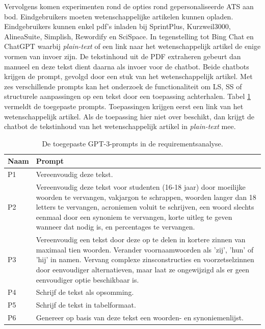 \medspace

Vervolgens komen experimenten rond de opties rond gepersonaliseerde ATS aan bod. Eindgebruikers moeten wetenschappelijke artikelen kunnen opladen. Eindgebruikers kunnen enkel pdf's inladen bij SprintPlus, Kurzweil3000, AlineaSuite, Simplish, Rewordify en SciSpace. In tegenstelling tot Bing Chat en ChatGPT waarbij \textit{plain-text} of een link naar het wetenschappelijk artikel de enige vormen van invoer zijn. De tekstinhoud uit de PDF extraheren gebeurt dan manueel en deze tekst dient daarna als invoer voor de chatbot. Beide chatbots krijgen de prompt, gevolgd door een stuk van het wetenschappelijk artikel. Met zes verschillende prompts kan het onderzoek de functionaliteit om LS, SS of structurele aanpassingen op een tekst door een toepassing achterhalen. Tabel \ref{table:tested-prompts-requirementsanalysis} vermeldt de toegepaste prompts. Toepassingen krijgen eerst een link van het wetenschappelijk artikel. Als de toepassing hier niet over beschikt, dan krijgt de chatbot de tekstinhoud van het wetenschappelijk artikel in \textit{plain-text} mee. 

\begin{center}
	\begin{table}[H]
		\begin{tabular}{ | m{2cm} | m{14cm} | } 
			\hline
			\textbf{Naam} & \textbf{Prompt} \\
			\hline
			P1 & Vereenvoudig deze tekst. \\
			\hline
			P2 & Vereenvoudig deze tekst voor studenten (16-18 jaar) door moeilijke woorden te vervangen, vakjargon te schrappen, woorden langer dan 18 letters te vervangen, acroniemen voluit te schrijven, een woord slechts eenmaal door een synoniem te vervangen, korte uitleg te geven wanneer dat nodig is, en percentages te vervangen. \\
			\hline
			P3 & Vereenvoudig een tekst door deze op te delen in kortere zinnen van maximaal tien woorden. Verander voornaamwoorden als 'zij', 'hun' of 'hij' in namen. Vervang complexe zinsconstructies en voorzetselzinnen door eenvoudiger alternatieven, maar laat ze ongewijzigd als er geen eenvoudiger optie beschikbaar is. \\
			\hline
			P4 & Schrijf de tekst als opsomming. \\
			\hline
			P5 & Schrijf de tekst in tabelformaat. \\
			\hline
			P6 & Genereer op basis van deze tekst een woorden- en synoniemenlijst. \\
			\hline
		\end{tabular}
		\caption{De toegepaste GPT-3-prompts in de requirementsanalyse.}
		\label{table:tested-prompts-requirementsanalysis}
	\end{table}
\end{center}

